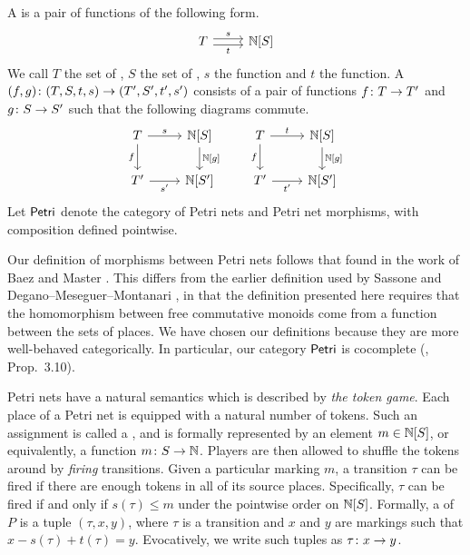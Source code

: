 \begin{defn}
\label{def:Petri}
    A  is a pair of functions of the following form.
    \[\begin{tikzcd}
        T 
        \arrow[r, shift left, "s"]
        \arrow[r, shift right, "t", swap]
        & 
        \N[S]
    \end{tikzcd}\]
    We call $T$ the set of , $S$ the set of , $s$ the  function and $t$ the  function. A  $(f,g) \colon (T,S,t,s) \to (T',S',t',s')$ consists of a pair of functions $f \colon T \to T'$ and $g \colon S \to S'$ such that the following diagrams commute.
    \[
    \begin{tikzcd}
        T
        \arrow[r, "s"]
        \arrow[d, "f", swap]
        &
        \N[S]
        \arrow[d, "{\N[g]}"]
        \\
        T'
        \arrow[r, "s'", swap]
        &
        \N[S']
    \end{tikzcd}
    \qquad
    \begin{tikzcd}
        T
        \arrow[r, "t"]
        \arrow[d, "f", swap]
        &
        \N[S]
        \arrow[d, "{\N[g]}"]
        \\
        T'
        \arrow[r, "t'", swap]
        &
        \N[S']
    \end{tikzcd}\] 
    Let $\mathsf{Petri}$ denote the category of Petri nets and Petri net morphisms, with composition defined pointwise.
\end{defn}

\noindent Our definition of morphisms between Petri nets follows that found in the work of Baez and Master \cite{GeneralizedPetriNets, OpenPetriNets}. This differs from the earlier definition used by Sassone \cite{SassoneStrong, SassoneAxiom} and Degano--Meseguer--Montanari \cite{DMM}, in that the definition presented here requires that the homomorphism between free commutative monoids come from a function between the sets of places. We have chosen our definitions because they are more well-behaved categorically. In particular, our category $\mathsf{Petri}$ is cocomplete (\cite{GeneralizedPetriNets}, Prop.\ 3.10).

Petri nets have a natural semantics which is described by \emph{the token game}. Each place of a Petri net is equipped with a natural number of tokens.  Such an assignment is called a , and is formally represented by an element $m \in \mathbb{N}[S]$, or equivalently, a function $m \colon S \to \mathbb{N}$. Players are then allowed to shuffle the tokens around by \emph{firing} transitions. Given a particular marking $m$, a transition $\tau$ can be fired if there are enough tokens in all of its source places. Specifically, $\tau$ can be fired if and only if $s(\tau) \leq m$ under the pointwise order on $\mathbb{N}[S]$. Formally, a  of $P$ is a tuple $(\tau,x,y)$, where $\tau$ is a transition and $x$ and $y$ are markings such that $x-s(\tau) + t(\tau) = y$. Evocatively, we write such tuples as $\tau \colon x \to y$. 

